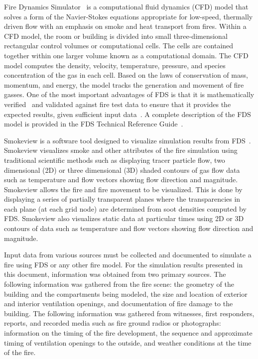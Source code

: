 \documentclass[12pt,oneside]{book}
\begin{document}
Fire Dynamics Simulator~\cite{FDS_Users_Guide} is a computational fluid dynamics (CFD) model that solves a form of the Navier-Stokes equations appropriate for low-speed, thermally driven flow with an emphasis on smoke and heat transport from fires. Within a CFD model, the room or building is divided into small three-dimensional rectangular control volumes or computational cells. The cells are contained together within one larger volume known as a computational domain. The CFD model computes the density, velocity, temperature, pressure, and species concentration of the gas in each cell. Based on the laws of conservation of mass, momentum, and energy, the model tracks the generation and movement of fire gasses. One of the most important advantages of FDS is that it is mathematically verified~\cite{FDS_Verification_Guide} and validated against fire test data to ensure that it provides the expected results, given sufficient input data~\cite{FDS_Validation_Guide}. A complete description of the FDS model is provided in the FDS Technical Reference Guide~\cite{FDS_Math_Guide}.

Smokeview is a software tool designed to visualize simulation results from FDS~\cite{Smokeview_Users_Guide}. Smokeview visualizes smoke and other attributes of the fire simulation using traditional scientific methods such as displaying tracer particle flow, two dimensional (2D) or three dimensional (3D) shaded contours of gas flow data such as temperature and flow vectors showing flow direction and magnitude. Smokeview allows the fire and fire movement to be visualized. This is done by displaying a series of partially transparent planes where the transparencies in each plane (at each grid node) are determined from soot densities computed by FDS. Smokeview also visualizes static data at particular times using 2D or 3D contours of data such as temperature and flow vectors showing flow direction and magnitude.

Input data from various sources must be collected and documented to simulate a fire using FDS or any other fire model. For the simulation results presented in this document, information was obtained from two primary sources. The following information was gathered from the fire scene: the geometry of the building and the compartments being modeled, the size and location of exterior and interior ventilation openings, and documentation of fire damage to the building. The following information was gathered from witnesses, first responders, reports, and recorded media such as fire ground radios or photographs: information on the timing of the fire development, the sequence and approximate timing of ventilation openings to the outside, and weather conditions at the time of the fire. 
\end{document}
